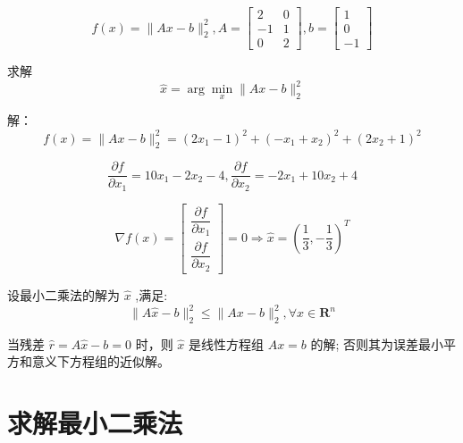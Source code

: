 \begin{example}
    \begin{equation} f(x)=\|A x-b\|_{2}^{2}, {A}=\left[\begin{array}{cc}2 & 0 \\ -1 & 1 \\ 0 & 2\end{array}\right], b=\left[\begin{array}{c}1 \\ 0 \\ -1\end{array}\right] \end{equation}

    求解\begin{equation}\hat{x} = \arg \underset{x}{\min} \|A x-b\|_{2}^{2}\end{equation}

    解：
    \begin{equation} f(x)=\|A x-b\|_{2}^{2}=\left(2 x_{1}-1\right)^{2}+\left(-x_{1}+x_{2}\right)^{2}+\left(2 x_{2}+1\right)^{2} \end{equation}

    \begin{equation} \frac{\partial f}{\partial x_{1}}=10 x_{1}-2 x_{2}-4 , \frac{\partial f}{\partial x_{2}}=-2 x_{1}+10 x_{2}+4 \end{equation}

    \begin{equation} \nabla f(x)=\left[\begin{array}{l}\dfrac{\partial f}{\partial x_{1}} \\ \dfrac{\partial f}{\partial x_{2}}\end{array}\right]=0 \Rightarrow \hat{x}=\left(\frac{1}{3},-\frac{1}{3}\right)^{T} \end{equation}
\end{example}


\begin{theorem}
    设最小二乘法的解为 $ \hat{x} $ ,满足:
    \begin{equation}
    \|A \hat{x}-b\|_{2}^{2} \leq\|A x-b\|_{2}^{2}, \forall x \in \mathbf{R}^{n}
    \end{equation}

    当残差 $ \hat{r}=A \hat{x}-b=0 $ 时，则 $ \hat{x} $ 是线性方程组 $ A x=b $ 的解; 否则其为误差最小平方和意义下方程组的近似解。
\end{theorem}



\section{求解最小二乘法}

